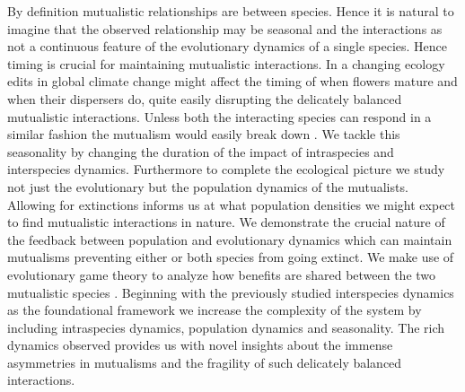 \documentclass[12pt]{article}
\newcommand{\cha}[1]{\textcolor{darkblue}{#1}}
\newcommand{\marcus}[1]{\textcolor{darkgreen}{#1}}
\begin{document}
By definition mutualistic relationships are between species.
Hence it is natural to imagine that the observed relationship may be seasonal and the interactions as not a continuous feature of the evolutionary dynamics of a single species.
Hence timing is crucial for maintaining mutualistic interactions.
In a changing ecology edits in global climate change might affect the timing of when flowers mature and when their dispersers do, quite easily disrupting the delicately balanced mutualistic interactions.
Unless both the interacting species can respond in a similar fashion the mutualism would easily break down \citep{warren:GCB:2014}.
We tackle this seasonality by changing the duration of the impact of intraspecies and interspecies dynamics.
Furthermore to complete the ecological picture we study not just the evolutionary but the population dynamics of the mutualists.
Allowing for extinctions informs us at what population densities we might expect to find mutualistic interactions in nature.
We demonstrate the crucial nature of the feedback between population and evolutionary dynamics which can maintain mutualisms preventing either or both species from going extinct. 
We make use of evolutionary game theory to analyze how benefits are shared between the two mutualistic species
\citep{weibull:book:1995,hofbauer:JMB:1996,hofbauer:book:1998}.
Beginning with the previously studied interspecies dynamics as the foundational framework \citep{gokhale:PRSB:2012} we increase the complexity of the system by including intraspecies dynamics, population dynamics and seasonality.
The rich dynamics observed provides us with novel insights about the immense asymmetries in mutualisms and the fragility of such delicately balanced interactions.

\end{document}
